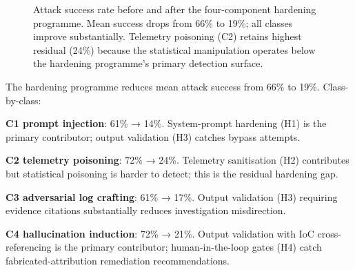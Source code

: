 \documentclass[sigconf,nonacm]{acmart}
\begin{document}
\begin{figure}[h]
\centering
{}
\caption{Attack success rate before and after the four-component
  hardening programme. Mean success drops from 66\% to 19\%;
  all classes improve substantially. Telemetry poisoning (C2)
  retains highest residual (24\%) because the statistical
  manipulation operates below the hardening programme's primary
  detection surface.}
\label{fig:hardening}
\end{figure}

The hardening programme reduces mean attack success from 66\%
to 19\%. Class-by-class:

\textbf{C1 prompt injection}: 61\% → 14\%. System-prompt
hardening (H1) is the primary contributor; output validation (H3)
catches bypass attempts.

\textbf{C2 telemetry poisoning}: 72\% → 24\%. Telemetry
sanitisation (H2) contributes but statistical poisoning is
harder to detect; this is the residual hardening gap.

\textbf{C3 adversarial log crafting}: 61\% → 17\%. Output
validation (H3) requiring evidence citations substantially
reduces investigation misdirection.

\textbf{C4 hallucination induction}: 72\% → 21\%. Output
validation with IoC cross-referencing is the primary
contributor; human-in-the-loop gates (H4) catch
fabricated-attribution remediation recommendations.
\end{document}
